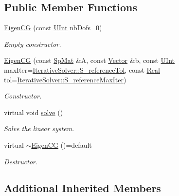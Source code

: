 \subsection*{Public Member Functions}
\begin{DoxyCompactItemize}
\item 
\hyperlink{classFVCode3D_1_1EigenCG_a8bf07bc78042cbc7dacdb9eaedd941eb}{Eigen\+CG} (const \hyperlink{namespaceFVCode3D_a4bf7e328c75d0fd504050d040ebe9eda}{U\+Int} nb\+Dofs=0)
\begin{DoxyCompactList}\small\item\em Empty constructor. \end{DoxyCompactList}\item 
\hyperlink{classFVCode3D_1_1EigenCG_a01a141ef7435f1c52d2c69325544b255}{Eigen\+CG} (const \hyperlink{namespaceFVCode3D_ac1032289d96638cf0ad6c52ef639095f}{Sp\+Mat} \&A, const \hyperlink{namespaceFVCode3D_a16ccf345652402bccd1a5d2e6782526c}{Vector} \&b, const \hyperlink{namespaceFVCode3D_a4bf7e328c75d0fd504050d040ebe9eda}{U\+Int} max\+Iter=\hyperlink{classFVCode3D_1_1IterativeSolver_a2afd68f254311907309444138d7f1b89}{Iterative\+Solver\+::\+S\+\_\+reference\+Tol}, const \hyperlink{namespaceFVCode3D_a40c1f5588a248569d80aa5f867080e83}{Real} tol=\hyperlink{classFVCode3D_1_1IterativeSolver_a938effdbfaa21c23226bfedf904787c2}{Iterative\+Solver\+::\+S\+\_\+reference\+Max\+Iter})
\begin{DoxyCompactList}\small\item\em Constructor. \end{DoxyCompactList}\item 
virtual void \hyperlink{classFVCode3D_1_1EigenCG_a83780a13ba3e3c60e6ad9b587d51ad41}{solve} ()
\begin{DoxyCompactList}\small\item\em Solve the linear system. \end{DoxyCompactList}\item 
virtual \hyperlink{classFVCode3D_1_1EigenCG_aab7f6585acd88ef9cdaf12c0b778a725}{$\sim$\+Eigen\+CG} ()=default
\begin{DoxyCompactList}\small\item\em Destructor. \end{DoxyCompactList}\end{DoxyCompactItemize}
\subsection*{Additional Inherited Members}


